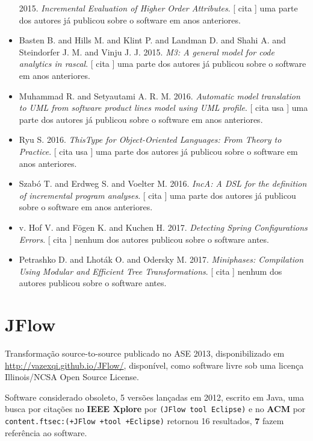 \begin{itemize}
      2015.
        \textit{ Incremental Evaluation of Higher Order Attributes}.
      [
          cita
      ]
uma parte dos autores já publicou sobre o software em anos anteriores.
\item Basten B. and Hills M. and Klint P. and Landman D. and Shahi A. and Steindorfer J. M. and Vinju J. J.
      2015.
        \textit{ M3: A general model for code analytics in rascal}.
      [
          cita
      ]
uma parte dos autores já publicou sobre o software em anos anteriores.
\item Muhammad R. and Setyautami A. R. M.
      2016.
        \textit{ Automatic model translation to UML from software product lines model using UML profile}.
      [
          cita
          usa
      ]
uma parte dos autores já publicou sobre o software em anos anteriores.
\item Ryu S.
      2016.
        \textit{ ThisType for Object-Oriented Languages: From Theory to Practice}.
      [
          cita
          usa
      ]
uma parte dos autores já publicou sobre o software em anos anteriores.
\item Szabó T. and Erdweg S. and Voelter M.
      2016.
        \textit{ IncA: A DSL for the definition of incremental program analyses}.
      [
          cita
      ]
uma parte dos autores já publicou sobre o software em anos anteriores.
\item v. Hof V. and F\"{o}gen K. and Kuchen H.
      2017.
        \textit{ Detecting Spring Configurations Errors}.
      [
          cita
      ]
nenhum dos autores publicou sobre o software antes.
\item Petrashko D. and Lhot\'{a}k O. and Odersky M.
      2017.
        \textit{ Miniphases: Compilation Using Modular and Efficient Tree Transformations}.
      [
          cita
      ]
nenhum dos autores publicou sobre o software antes.
\end{itemize}
\section{JFlow}

Transformação source-to-source
publicado no ASE 2013,
disponibilizado em \url{http://vazexqi.github.io/JFlow/},
disponível,
como software livre
sob uma licença Illinois/NCSA Open Source License.

Software considerado obsoleto,
5 versões lançadas
em 2012,
escrito em Java,
uma busca por citações no {\bf IEEE Xplore} por
\texttt{(JFlow tool Eclipse)}
e no {\bf ACM} por
\texttt{content.ftsec:(+JFlow +tool +Eclipse)}
retornou
16 resultados,
{\bf 7} fazem referência ao software.

